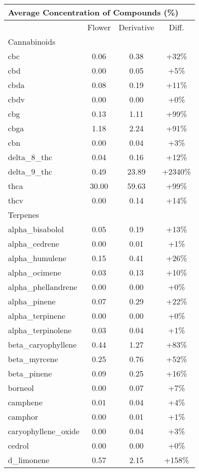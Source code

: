
\begin{table}[H]
\centering
\begin{tabular}{lccc}
\multicolumn{4}{l}{Average Concentration of Compounds (\%)} \\
\hline
& Flower & Derivative & Diff. \\
\hline
\multicolumn{4}{l}{Cannabinoids} \\
\hline
cbc & 0.06 & 0.38 & +32\% \\
cbd & 0.00 & 0.05 & +5\% \\
cbda & 0.08 & 0.19 & +11\% \\
cbdv & 0.00 & 0.00 & +0\% \\
cbg & 0.13 & 1.11 & +99\% \\
cbga & 1.18 & 2.24 & +91\% \\
cbn & 0.00 & 0.04 & +3\% \\
delta\_8\_thc & 0.04 & 0.16 & +12\% \\
delta\_9\_thc & 0.49 & 23.89 & +2340\% \\
thca & 30.00 & 59.63 & +99\% \\
thcv & 0.00 & 0.14 & +14\% \\
\hline
\multicolumn{4}{l}{Terpenes} \\
\hline
alpha\_bisabolol & 0.05 & 0.19 & +13\% \\
alpha\_cedrene & 0.00 & 0.01 & +1\% \\
alpha\_humulene & 0.15 & 0.41 & +26\% \\
alpha\_ocimene & 0.03 & 0.13 & +10\% \\
alpha\_phellandrene & 0.00 & 0.00 & +0\% \\
alpha\_pinene & 0.07 & 0.29 & +22\% \\
alpha\_terpinene & 0.00 & 0.00 & +0\% \\
alpha\_terpinolene & 0.03 & 0.04 & +1\% \\
beta\_caryophyllene & 0.44 & 1.27 & +83\% \\
beta\_myrcene & 0.25 & 0.76 & +52\% \\
beta\_pinene & 0.09 & 0.25 & +16\% \\
borneol & 0.00 & 0.07 & +7\% \\
camphene & 0.01 & 0.04 & +4\% \\
camphor & 0.00 & 0.01 & +1\% \\
caryophyllene\_oxide & 0.00 & 0.04 & +3\% \\
cedrol & 0.00 & 0.00 & +0\% \\
d\_limonene & 0.57 & 2.15 & +158\% \\

\end{tabular}
\end{table}
